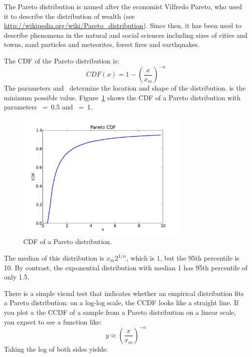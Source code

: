 \documentclass[12pt]{book}
\begin{document}
The Pareto distribution is named after the economist Vilfredo Pareto,
who used it to describe the distribution of wealth (see
\url{http://wikipedia.org/wiki/Pareto_distribution}).  Since then, it has
been used to describe phenomena in the natural and social
sciences including sizes of cities and towns, sand particles and
meteorites, forest fires and earthquakes.

The CDF of the Pareto distribution is:
%
\[ CDF(x) = 1 - \left( \frac{x}{x_m} \right) ^{-\alpha} \]
%
The parameters \x {} and \myalpha~determine the location and shape of
the distribution. \x {} is the minimum possible value.
Figure~\ref{pareto_cdf} shows the CDF of a Pareto distribution with
parameters \x {}~=~0.5 and \myalpha~=~1.

\begin{figure}
\centerline{\includegraphics[height=2.5in]{figs/pareto_cdf.pdf}}
\caption{CDF of a Pareto distribution.}
\label{pareto_cdf}
\end{figure}

The median of this distribution is $x_m 2^{1/\alpha}$, which is 1, but
the 95th percentile is 10.  By contrast, the exponential distribution
with median 1 has 95th percentile of only 1.5.    

There is a simple visual test that indicates whether an empirical
distribution fits a Pareto distribution: on a log-log scale, the CCDF
looks like a straight line.
If you plot a the CCDF of a sample from a Pareto distribution on a
linear scale, you expect to see a function like:
%
\[ y \approx \left( \frac{x}{x_m} \right) ^{-\alpha} \]
%
Taking the log of both sides yields:

\end{document}
